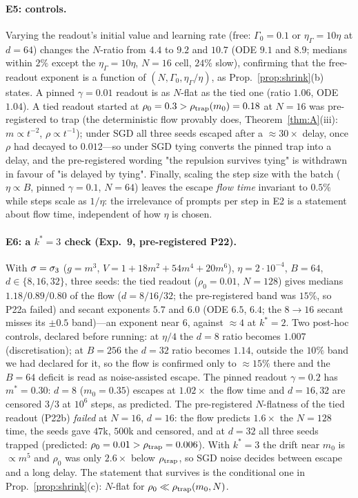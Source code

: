 \paragraph{E5: controls.}
Varying the readout's initial value and learning rate (free: $\Gamma_0=0.1$ or $\eta_\Gamma=10\eta$ at $d=64$) changes the $N$-ratio from $4.4$ to
$9.2$ and $10.7$ (ODE $9.1$ and $8.9$; medians within $2\%$ except the $\eta_\Gamma=10\eta$, $N=16$ cell, $24\%$ slow), confirming that the
free-readout exponent is a function of $(N,\Gamma_0,\eta_\Gamma/\eta)$, as Prop.~\ref{prop:shrink}(b) states. A pinned $\gamma=0.01$ readout is as
$N$-flat as the tied one (ratio $1.06$, ODE $1.04$). A tied readout started at $\rho_0=0.3>\rho_{\rm trap}(m_0)=0.18$ at $N=16$ was pre-registered to trap
(the deterministic flow provably does, Theorem~\ref{thm:A}(iii): $m\propto t^{-2}$, $\rho\propto t^{-1}$); under SGD all three seeds escaped after a $\approx30\times$ delay, once $\rho$ had
decayed to $0.012$---so under SGD tying converts the pinned trap into a delay, and the pre-registered wording "the repulsion survives tying" is
withdrawn in favour of "is delayed by tying". Finally, scaling the step size with the batch ($\eta\propto B$, pinned $\gamma=0.1$, $N=64$)
leaves the escape \emph{flow time} invariant to $0.5\%$ while steps scale as $1/\eta$: the irrelevance of prompts per step in E2 is a
statement about flow time, independent of how $\eta$ is chosen.

\paragraph{E6: a $k^*=3$ check (Exp.~9, pre-registered P22).}
With $\sigma=\sigma_3$ ($g=m^3$, $V=1+18m^2+54m^4+20m^6$), $\eta=2\cdot10^{-4}$, $B=64$, $d\in\{8,16,32\}$, three seeds: the tied readout ($\rho_0=0.01$, $N=128$)
gives medians $1.18/0.89/0.80$ of the flow ($d=8/16/32$; the pre-registered band was $15\%$, so P22a failed) and secant exponents $5.7$ and $6.0$ (ODE $6.5$, $6.4$; the $8\to16$ secant misses its $\pm0.5$ band)---an exponent near $6$, against $\approx4$ at $k^*=2$. Two post-hoc controls, declared before running: at $\eta/4$ the $d=8$ ratio becomes $1.007$ (discretisation); at $B=256$ the $d=32$ ratio becomes $1.14$, outside the $10\%$ band we had declared for it, so the flow is confirmed only to $\approx15\%$ there and the $B=64$ deficit is read as noise-assisted escape. The pinned readout $\gamma=0.2$ has $m^*=0.30$: $d=8$ ($m_0=0.35$) escapes at $1.02\times$ the flow time and $d=16,32$ are
censored $3/3$ at $10^6$ steps, as predicted. The pre-registered $N$-flatness of the tied readout (P22b) \emph{failed} at $N=16$, $d=16$: the flow predicts $1.6\times$ the $N=128$ time,
the seeds gave $47$k, $500$k and censored, and at $d=32$ all three seeds trapped (predicted: $\rho_0=0.01>\rho_{\rm trap}=0.006$). With $k^*=3$ the drift near $m_0$ is $\propto m^5$ and
$\rho_0$ was only $2.6\times$ below $\rho_{\rm trap}$, so SGD noise decides between escape and a long delay. The statement that survives is the conditional one in
Prop.~\ref{prop:shrink}(c): $N$-flat for $\rho_0\ll\rho_{\rm trap}(m_0,N)$.

